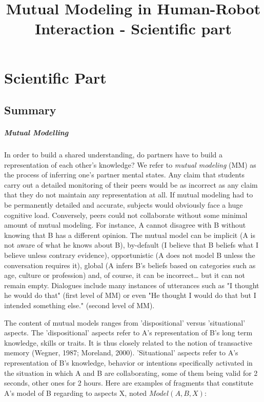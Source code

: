 \documentclass{report}
\begin{document}
\title{Mutual Modeling in Human-Robot Interaction - Scientific part}

\chapter{Scientific Part}
\section{Summary}

\paragraph{Mutual Modelling}

In order to build a shared understanding, do partners have to build a
representation of each other's knowledge? We refer to \emph{mutual modeling} (MM) as
the process of inferring one's partner mental states. Any claim that students
carry out a detailed monitoring of their peers would be as incorrect as any
claim that they do not maintain any representation at all. If mutual modeling
had to be permanently detailed and accurate, subjects would obviously face a
huge cognitive load. Conversely, peers could not collaborate without some
minimal amount of mutual modeling. For instance, A cannot disagree with B
without knowing that B has a different opinion. The mutual model can be implicit
(A is not aware of what he knows about B), by-default (I believe that B beliefs
what I believe unless contrary evidence), opportunistic (A does not model B
unless the conversation requires it), global (A infers B's beliefs based on
categories such as age, culture or profession) and, of course, it can be
incorrect… but it can not remain empty. Dialogues include many instances of
utterances such as "I thought he would do that" (first level of MM) or even "He
thought I would do that but I intended something else." (second level of MM). 

The content of mutual models ranges from 'dispositional' versus 'situational'
aspects. The 'dispositional' aspects refer to A's representation of B's long
term knowledge, skills or traits. It is thus closely related to the notion of
transactive memory (Wegner, 1987; Moreland, 2000). 'Situational' aspects refer
to A's representation of B's knowledge, behavior or intentions specifically
activated in the situation in which A and B are collaborating, some of them
being valid for 2 seconds, other ones for 2 hours. Here are examples of
fragments that constitute A's model of B regarding to aspects X, noted
$Model(A,B,X)$:
\end{document}
